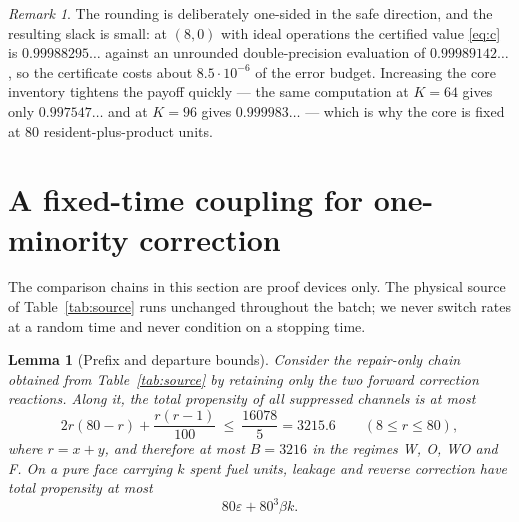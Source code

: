 \documentclass[11pt,a4paper]{article}
\theoremstyle{plain}
\newtheorem{lemma}[theorem]{Lemma}
\theoremstyle{definition}
\theoremstyle{remark}
\newtheorem{remark}[theorem]{Remark}
\newcommand{\eps}{\varepsilon}
\begin{document}
\begin{remark}
The rounding is deliberately one-sided in the safe direction, and the resulting slack is
small: at $(8,0)$ with ideal operations the certified value \eqref{eq:c} is
$0.99988295\ldots$ against an unrounded double-precision evaluation of $0.99989142\ldots$,
so the certificate costs about $8.5\cdot10^{-6}$ of the error budget. Increasing the core
inventory tightens the payoff quickly --- the same computation at $K=64$ gives only
$0.997547\ldots$ and at $K=96$ gives $0.999983\ldots$ --- which is why the core is fixed at
$80$ resident-plus-product units.
\end{remark}

\section{A fixed-time coupling for one-minority correction}\label{sec:coupling}

The comparison chains in this section are proof devices only. The physical source of
Table~\ref{tab:source} runs unchanged throughout the batch; we never switch rates at a
random time and never condition on a stopping time.

\begin{lemma}[Prefix and departure bounds]\label{lem:prefix}
Consider the \emph{repair-only} chain obtained from Table~\ref{tab:source} by retaining
only the two forward correction reactions. Along it, the total propensity of all
suppressed channels is at most
\begin{equation}
2r(80-r)+\frac{r(r-1)}{100}\ \le\ \frac{16078}{5}=3215.6\qquad (8\le r\le 80),
\label{eq:prefixmax}
\end{equation}
where $r=x+y$, and therefore at most $B=3216$ in the regimes W, O, WO and F. On a pure
face carrying $k$ spent fuel units, leakage and reverse correction have total propensity
at most
\begin{equation}
80\eps+80^{3}\beta k .\label{eq:departure}
\end{equation}
\end{lemma}
\end{document}

